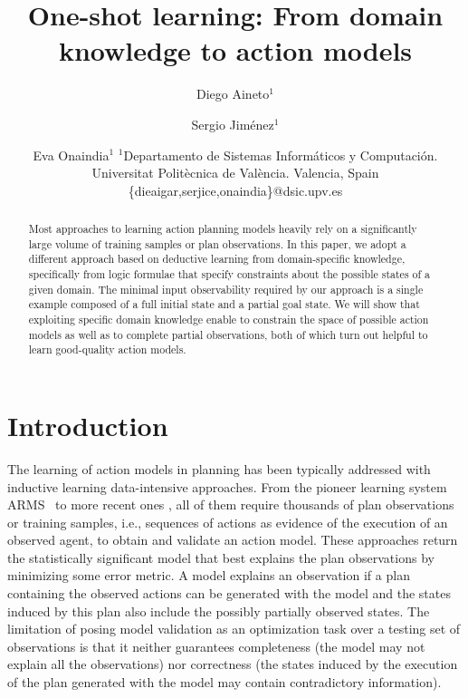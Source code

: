 \documentclass{article}
\title{One-shot learning: From domain knowledge to action models}
\author{
Diego Aineto$^1$\and
Sergio Jim\'enez$^1$\and
Eva Onaindia$^1$
\affiliations
$^1${\small Departamento de Sistemas Inform\'aticos y Computaci\'on. Universitat Polit\`ecnica de Val\`encia. Valencia, Spain}
\emails
{\scriptsize \{dieaigar,serjice,onaindia\}@dsic.upv.es}}
\newcommand{\ARMS}{{\small {\sffamily ARMS}}\xspace}
\begin{document}
\maketitle


\begin{abstract}
Most approaches to learning action planning models heavily rely on a significantly large volume of training samples or plan observations. In this paper, we adopt a different approach based on deductive learning from domain-specific knowledge, specifically from logic formulae that specify constraints about the possible states of a given domain. The minimal input observability required by our approach is a single example composed of a full initial state and a partial goal state. We will show that exploiting specific domain knowledge enable to constrain the space of possible action models as well as to complete partial observations, both of which turn out helpful to learn good-quality action models.
 \end{abstract}



\section{Introduction}
\label{sec:introduction}

The learning of action models in planning has been typically addressed with inductive learning data-intensive approaches. From the pioneer learning system \ARMS~\cite{yang2007learning} to more recent ones \cite{MouraoZPS12,zhuo2013action,kuvcera2018louga}, all of them require thousands of plan observations or training samples, i.e., sequences of actions as evidence of the execution of an observed agent, to obtain and validate an action model. These approaches return the statistically significant model that best explains the plan observations by minimizing some error metric. A model explains an observation if a plan containing the observed actions can be generated with the model and the states induced by this plan also include the possibly partially observed states. The limitation of posing model validation as an optimization task over a testing set of observations is that it neither guarantees completeness (the model may not explain all the observations) nor correctness (the states induced by the execution of the plan generated with the model may contain contradictory information).
\end{document}
